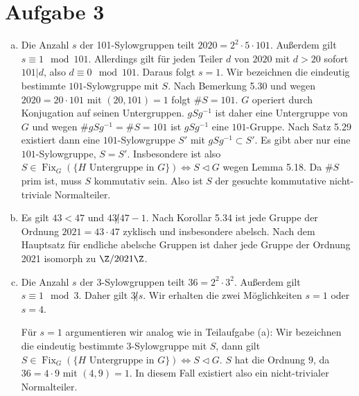 \documentclass{article}
\begin{document}
\section*{Aufgabe 3}
\begin{enumerate}[(a)]
    \item Die Anzahl $s$ der 101-Sylowgruppen teilt $2020 = 2^2 \cdot 5 \cdot 101$. Außerdem gilt $s \equiv 1 \mod 101$.
    Allerdings gilt für jeden Teiler $d$ von $2020$ mit $d > 20$ sofort $101 | d$, also $d \equiv 0 \mod 101$.
    Daraus folgt $s = 1$. 
    Wir bezeichnen die eindeutig bestimmte $101$-Sylowgruppe mit $S$. Nach Bemerkung 5.30 und wegen $2020 = 20 \cdot 101$
    mit $(20, 101) = 1$ folgt $\# S = 101$.
    $G$ operiert durch Konjugation auf seinen Untergruppen.
    $gSg^{-1}$ ist daher eine Untergruppe von $G$ und wegen $\# gSg^{-1} = \# S = 101$ ist $gSg^{-1}$ eine $101$-Gruppe.
    Nach Satz 5.29 existiert dann eine $101$-Sylowgruppe $S'$ mit $gSg^{-1} \subset S'$.
    Es gibt aber nur eine $101$-Sylowgruppe, $S = S'$.
    Insbesondere ist also $S \in \operatorname{Fix}_G(\{H \text{ Untergruppe in } G\}) \Leftrightarrow S \triangleleft G$ 
    wegen Lemma 5.18. Da $\# S$ prim ist, muss $S$ kommutativ sein.
    Also ist $S$ der gesuchte kommutative nicht-triviale Normalteiler.
    \item Es gilt $43 < 47$ und $43 \not | 47-1$. Nach Korollar 5.34 ist jede Gruppe der Ordnung $2021 = 43\cdot 47$ zyklisch 
    und insbesondere abelsch. Nach dem Hauptsatz für endliche abelsche Gruppen ist daher jede Gruppe der Ordnung 2021
    isomorph zu $\Z/2021\Z$.
    \item Die Anzahl $s$ der $3$-Sylowgruppen teilt $36 = 2^2\cdot 3^2$. Außerdem gilt $s \equiv 1 \mod 3$.
    Daher gilt $3 \not | s$. Wir erhalten die zwei Möglichkeiten $s = 1$ oder $s = 4$. 

    Für $s = 1$ argumentieren wir analog wie
    in Teilaufgabe (a): Wir bezeichnen die eindeutig bestimmte $3$-Sylowgruppe mit $S$, dann gilt
    $S \in \operatorname{Fix}_G(\{H \text{ Untergruppe in } G\}) \Leftrightarrow S \triangleleft G$.
    $S$ hat die Ordnung $9$, da $36 = 4\cdot 9$ mit $(4,9) = 1$. In diesem Fall existiert also ein 
    nicht-trivialer Normalteiler.
    

\end{enumerate}
\end{document}
